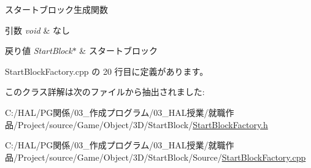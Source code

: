 スタートブロック生成関数 


\begin{DoxyParams}{引数}
{\em void} & なし \\
\hline
\end{DoxyParams}

\begin{DoxyRetVals}{戻り値}
{\em Start\+Block$\ast$} & スタートブロック \\
\hline
\end{DoxyRetVals}


 Start\+Block\+Factory.\+cpp の 20 行目に定義があります。



このクラス詳解は次のファイルから抽出されました\+:\begin{DoxyCompactItemize}
\item 
C\+:/\+H\+A\+L/\+P\+G関係/03\+\_\+作成プログラム/03\+\_\+\+H\+A\+L授業/就職作品/\+Project/source/\+Game/\+Object/3\+D/\+Start\+Block/\mbox{\hyperlink{_start_block_factory_8h}{Start\+Block\+Factory.\+h}}\item 
C\+:/\+H\+A\+L/\+P\+G関係/03\+\_\+作成プログラム/03\+\_\+\+H\+A\+L授業/就職作品/\+Project/source/\+Game/\+Object/3\+D/\+Start\+Block/\+Source/\mbox{\hyperlink{_start_block_factory_8cpp}{Start\+Block\+Factory.\+cpp}}\end{DoxyCompactItemize}
